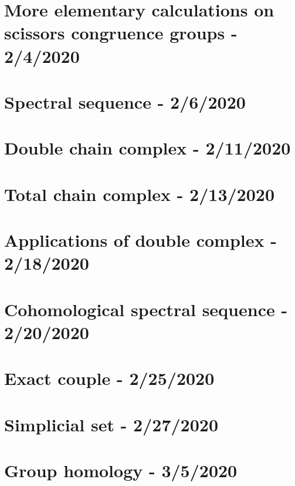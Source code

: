 \documentclass[a4paper,10pt]{article}
\begin{document}
\section{More elementary calculations on scissors congruence groups - 2/4/2020}

\newpage

\section{Spectral sequence - 2/6/2020}

\newpage

\section{Double chain complex - 2/11/2020}

\newpage

\section{Total chain complex - 2/13/2020}

\newpage

\section{Applications of double complex - 2/18/2020}

\newpage

\section{Cohomological spectral sequence - 2/20/2020}

\newpage

\section{Exact couple - 2/25/2020}

\newpage

\section{Simplicial set - 2/27/2020}

\newpage

\section{Group homology - 3/5/2020}

\newpage
\end{document}
